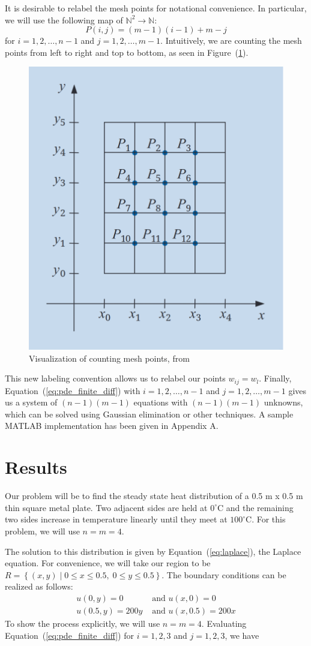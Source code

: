 \documentclass[12pt, titlepage]{article}
\begin{document}
    It is desirable to relabel the mesh points for notational convenience. In particular, we will use the following map of $\mathbb{N}^2 \to \mathbb{N}$:
    \begin{equation}\label{eq:counting}
        P(i,j) = (m-1)(i-1) + m-j
    \end{equation} 
    for $i=1,2,\dots,n-1$ and $j=1,2,\dots,m-1$. Intuitively, we are counting the mesh points from left to right and top to bottom, as seen in Figure~(\ref{fig:intuitive_grid}).
    \begin{figure}[H]
        \centering
        \includegraphics[width=0.4\linewidth]{intuitive_grid.png}
        \caption{Visualization of counting mesh points, from~\cite{burden_faires_2011}}\label{fig:intuitive_grid}
    \end{figure}
    This new labeling convention allows us to relabel our points $w_{ij} = w_l$. Finally, Equation~(\ref{eq:pde_finite_diff}) with $i=1,2,\dots,n-1$ and $j=1,2,\dots,m-1$
    gives us a system of $(n-1)(m-1)$ equations with $(n-1)(m-1)$ unknowns, which can be solved using Gaussian elimination or other techniques. A sample MATLAB implementation
    has been given in Appendix A.
    \section{Results}
    Our problem will be to find the steady state heat distribution of a 0.5 m x 0.5 m thin square metal plate. Two adjacent sides are held at $0^{\circ}$C and the remaining two sides
    increase in temperature linearly until they meet at $100^{\circ}$C. For this problem, we will use $n=m=4$.

    The solution to this distribution is given by Equation~(\ref{eq:laplace}), the Laplace equation.
    For convenience, we will take our region to be $R = \left\{(x,y)\; |\; 0 \leq x \leq 0.5,\;0\leq y \leq 0.5\right\}$.
    The boundary conditions can be realized as follows:
    \begin{equation}
        \begin{split}
            u(0,y) = 0 &\text{ and } u(x, 0) = 0\\
            u(0.5,y) = 200y &\text{ and } u(x, 0.5) = 200x
        \end{split}
    \end{equation}
    To show the process explicitly, we will use $n=m=4$. Evaluating Equation~(\ref{eq:pde_finite_diff}) for $i=1,2,3$ and $j=1,2,3$, we have
\end{document}
